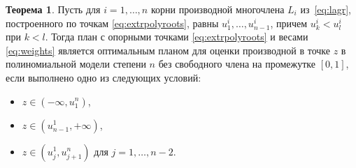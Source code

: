 \documentclass[specialist,
               substylefile = spbu.rtx,
               subf,href,colorlinks=true, 12pt]{disser}
\theoremstyle{definition}
\newtheorem{theorem}{Теорема}
\begin{document}
	\begin{theorem}
	\label{th1}
		Пусть для $i = 1, \ldots, n$ корни производной многочлена $L_i$ из~\eqref{eq:lagr}, построенного по точкам \eqref{eq:extrpolyroots}, равны $u_1^i, \ldots, u_{n-1}^i$, причем $u_k^i < u_l^i$ при $k < l$. Тогда план с опорными точками \eqref{eq:extrpolyroots} и весами \eqref{eq:weights} является оптимальным планом для оценки производной в точке $z$ в полиномиальной модели степени $n$ без свободного члена на промежутке $[0, 1]$, если выполнено одно из следующих условий:
		\begin{itemize}
			\item $z \in (-\infty, u_1^n)$,
			\item $z \in (u_{n-1}^1, +\infty )$,
			\item $z \in \left( u^1_j, u^n_{j+1} \right)$ для $j=1, \ldots, n-2$.
		\end{itemize}
	\end{theorem}
\end{document}
